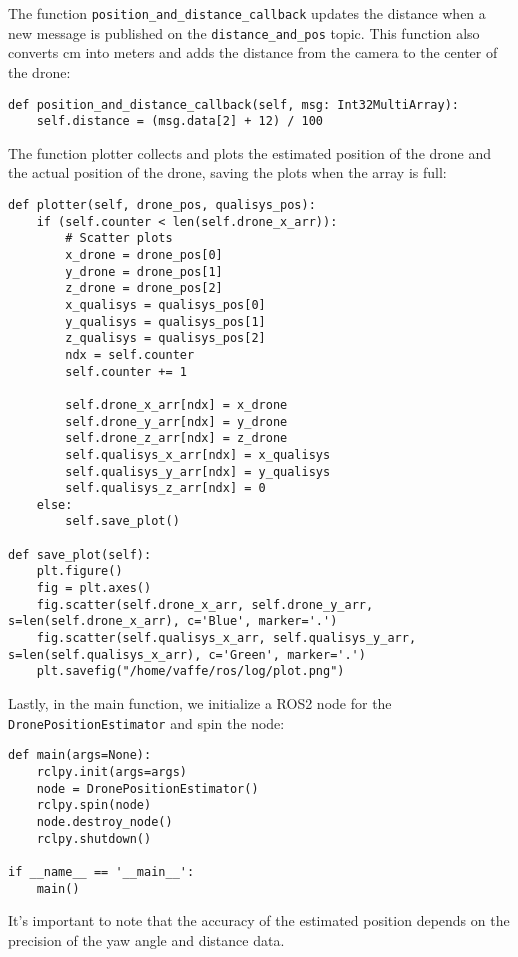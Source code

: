 The function \verb|position_and_distance_callback| updates the distance when a new message is published on the \verb|distance_and_pos| topic. This function also converts cm into meters and adds the distance from the camera to the center of the drone:

\begin{lstlisting}[language=PythonPlus]
def position_and_distance_callback(self, msg: Int32MultiArray):
    self.distance = (msg.data[2] + 12) / 100
\end{lstlisting}

The function plotter collects and plots the estimated position of the drone and the actual position of the drone, saving the plots when the array is full:

\begin{lstlisting}[language=PythonPlus]
def plotter(self, drone_pos, qualisys_pos):
    if (self.counter < len(self.drone_x_arr)):
        # Scatter plots
        x_drone = drone_pos[0]
        y_drone = drone_pos[1]
        z_drone = drone_pos[2]
        x_qualisys = qualisys_pos[0]
        y_qualisys = qualisys_pos[1]
        z_qualisys = qualisys_pos[2]
        ndx = self.counter
        self.counter += 1

        self.drone_x_arr[ndx] = x_drone
        self.drone_y_arr[ndx] = y_drone
        self.drone_z_arr[ndx] = z_drone
        self.qualisys_x_arr[ndx] = x_qualisys
        self.qualisys_y_arr[ndx] = y_qualisys
        self.qualisys_z_arr[ndx] = 0
    else:
        self.save_plot()
        
def save_plot(self):
    plt.figure()
    fig = plt.axes()
    fig.scatter(self.drone_x_arr, self.drone_y_arr, s=len(self.drone_x_arr), c='Blue', marker='.')
    fig.scatter(self.qualisys_x_arr, self.qualisys_y_arr, s=len(self.qualisys_x_arr), c='Green', marker='.')
    plt.savefig("/home/vaffe/ros/log/plot.png")
\end{lstlisting}

Lastly, in the main function, we initialize a ROS2 node for the \verb|DronePositionEstimator| and spin the node:

\begin{lstlisting}[language=PythonPlus]
def main(args=None):
    rclpy.init(args=args)
    node = DronePositionEstimator()
    rclpy.spin(node)
    node.destroy_node()
    rclpy.shutdown()

if __name__ == '__main__':
    main()
\end{lstlisting}

It's important to note that the accuracy of the estimated position depends on the precision of the yaw angle and distance data. 

